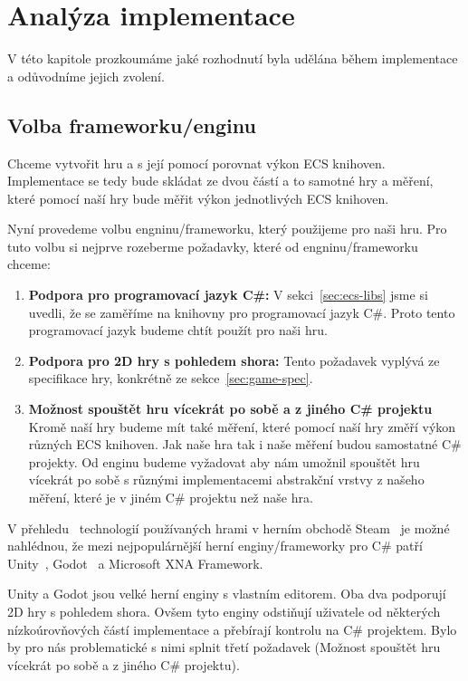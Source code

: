 \chapter{Analýza implementace}
V této kapitole prozkoumáme jaké rozhodnutí byla udělána během implementace a odůvodníme jejich zvolení.


\section{Volba frameworku/enginu}
Chceme vytvořit hru a s její pomocí porovnat výkon ECS knihoven. Implementace se tedy bude skládat ze dvou částí a to samotné hry a měření, které pomocí naší hry bude měřit výkon jednotlivých ECS knihoven.

Nyní provedeme volbu engninu/frameworku, který použijeme pro naši hru. Pro tuto volbu si nejprve rozeberme požadavky, které od engninu/frameworku chceme:

\begin{enumerate}
    \item \textbf{Podpora pro programovací jazyk C\#:} V sekci~\ref{sec:ecs-libs} jsme si uvedli, že se zaměříme na knihovny pro programovací jazyk C\#. Proto tento programovací jazyk budeme chtít použít pro naši hru.
    \item \textbf{Podpora pro 2D hry s pohledem shora:} Tento požadavek vyplývá ze specifikace hry, konkrétně ze sekce~\ref{sec:game-spec}.
    \item \textbf{Možnost spouštět hru vícekrát po sobě a z jiného C\# projektu} Kromě naší hry budeme mít také měření, které pomocí naší hry změří výkon různých ECS knihoven. Jak naše hra tak i naše měření budou samostatné C\# projekty. Od enginu budeme vyžadovat aby nám umožnil spouštět hru vícekrát po sobě s různými implementacemi abstrakční vrstvy z našeho měření, které je v jiném C\# projektu než naše hra.    
\end{enumerate}

V přehledu~\cite{SteamDB} technologií používaných hrami v herním obchodě Steam~\cite{Steam} je možné nahlédnou, že mezi nejpopulárnější herní enginy/frameworky pro C\# patří Unity~\cite{Unity}, Godot~\cite{Godot} a Microsoft XNA Framework.

Unity a Godot jsou velké herní enginy s vlastním editorem. Oba dva podporují 2D hry s pohledem shora. Ovšem tyto enginy odstiňují uživatele od některých nízkoúrovňových částí implementace a přebírají kontrolu na C\# projektem. Bylo by pro nás problematické s nimi splnit třetí požadavek (Možnost spouštět hru vícekrát po sobě a z jiného C\# projektu).

